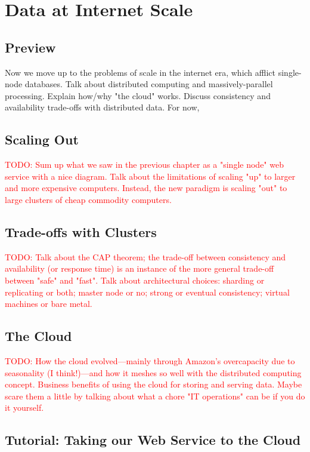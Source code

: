 \documentclass[11pt]{book}
\newcommand{\todo}[1]{\textcolor{red}{TODO: #1}} %
\begin{document}
\chapter{Data at Internet Scale}

\section*{Preview}

Now we move up to the problems of scale in the internet era, which afflict single-node databases.  Talk about distributed computing and massively-parallel processing.  Explain how/why "the cloud" works.  Discuss consistency and availability trade-offs with distributed data.  For now, 

\section{Scaling Out}
\todo{Sum up what we saw in the previous chapter as a "single node" web service with a nice diagram.  Talk about the limitations of scaling "up" to larger and more expensive computers.  Instead, the new paradigm is scaling "out" to large clusters of cheap commodity computers.}

\section{Trade-offs with Clusters}
\todo{Talk about the CAP theorem; the trade-off between consistency and availability (or response time) is an instance of the more general trade-off between "safe" and "fast".  Talk about architectural choices: sharding or replicating or both; master node or no; strong or eventual consistency; virtual machines or bare metal.}

\section{The Cloud}
\todo{How the cloud evolved---mainly through Amazon's overcapacity due to seasonality (I think!)---and how it meshes so well with the distributed computing concept.  Business benefits of using the cloud for storing and serving data.  Maybe scare them a little by talking about what a chore "IT operations" can be if you do it yourself.}



\section*{Tutorial: Taking our Web Service to the Cloud}
\end{document}
